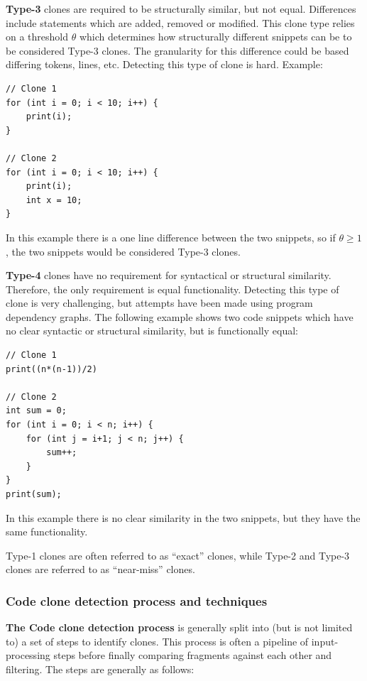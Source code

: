 \documentclass[12pt]{article}
\begin{document}
\textbf{Type-3} clones are required to be structurally similar, but not equal. Differences
include statements which are added, removed or modified. This clone type relies on a
threshold $\theta$ which determines how structurally different snippets can be to be
considered Type-3 clones\cite{Inoue_introduction_to_cc}. The granularity for this
difference could be based differing tokens, lines, etc. Detecting this type of clone is
hard. Example:

\begin{lstlisting}[frame=single]
// Clone 1
for (int i = 0; i < 10; i++) {
    print(i);
}

// Clone 2
for (int i = 0; i < 10; i++) {
    print(i);
    int x = 10;
}
\end{lstlisting}

In this example there is a one line difference between the two snippets, so if $\theta
	\geq
	1$, the two snippets would be considered Type-3 clones.

\textbf{Type-4} clones have no requirement for syntactical or structural similarity.
Therefore, the only requirement is equal functionality. Detecting this type of clone is
very challenging, but attempts have been made using program dependency
graphs\cite{SeedType4Detection}. The following example shows two code snippets which have
no clear syntactic or structural similarity, but is functionally equal:

\begin{lstlisting}[frame=single]
// Clone 1
print((n*(n-1))/2)

// Clone 2
int sum = 0;
for (int i = 0; i < n; i++) {
    for (int j = i+1; j < n; j++) {
        sum++;
    }
}
print(sum);
\end{lstlisting}

In this example there is no clear similarity in the two snippets, but they have the same
functionality.

Type-1 clones are often referred to as ``exact'' clones, while Type-2 and Type-3 clones
are referred to as ``near-miss'' clones\cite[1]{Zibran_real_time_search}.

\subsubsection{Code clone detection process and techniques}

\textbf{The Code clone detection process} is generally split into (but is not limited to)
a set of steps to identify clones\cite{Inoue_introduction_to_cc}. This
process is often a pipeline of input-processing steps before finally comparing fragments
against each other and filtering. The steps are generally as follows:
\end{document}
